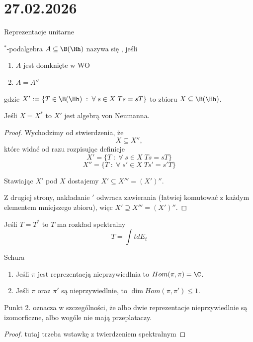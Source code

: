 \section{27.02.2026}{Reprezentacje unitarne}

\begin{definition}{}{}
  ${}^*$-podalgebra $A\subseteq \B(\Hh)$ nazywa się , jeśli
  \begin{enumerate}
    \item $A$ jest domknięte w WO
    \item $A=A''$
  \end{enumerate}
  gdzie $X':=\{T\in\B(\Hh)\;:\;\forall\;s\in X\;Ts=sT\}$ to  zbioru $X\subseteq \B(\Hh)$.
\end{definition}

\begin{fact}{}{}
  Jeśli $X=X^*$ to $X'$ jest algebrą von Neumanna.
\end{fact}

\begin{proof}
  Wychodzimy od stwierdzenia, że
  $$X\subseteq X'',$$
  które widać od razu rozpisując definicje
  $$X'=\{T\;:\;\forall\; s\in X\;Ts=sT\}$$
  $$X''=\{T\;:\;\forall\; s'\in X\;Ts'=s'T\}$$

  Stawiając $X'$ pod $X$ dostajemy $X'\subseteq X'''=(X')''$.

  Z drugiej strony, nakładanie $'$ odwraca zawierania (łatwiej komutować z każdym elementem mniejszego zbioru), więc $X'\supseteq X'''=(X')''$.
\end{proof}

\begin{fact}{}{}\color{red}
  Jeśli $T=T^*$ to $T$ ma rozkład spektralny
  $$T=\int t dE_t$$
\end{fact}

\begin{lemma}{Schura}{}
  \begin{enumerate}
    \item Jeśli $\pi$ jest reprezentacją nieprzywiedlnia to $Hom(\pi, \pi)=\C$.
    \item Jeśli $\pi$ oraz $\pi'$ są nieprzywiedlnie, to $\dim Hom(\pi, \pi')\leq 1$.
  \end{enumerate}
\end{lemma}

Punkt 2. oznacza w szczególności, że albo dwie reprezentacje nieprzywiedlnie są izomorficzne, albo wogóle nie mają przeplataczy.

\begin{proof}
  \color{red}tutaj trzeba wstawkę z twierdzeniem spektralnym
\end{proof}

